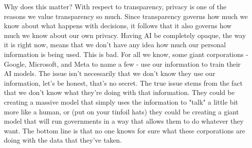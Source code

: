 Why does this matter? With respect to transparency, privacy is one of the reasons we value
transparency so much. Since transparency governs how much we know about what happens with
decisions, it follows that it also governs how much we know about our own privacy. Having AI
be completely opaque, the way it is right now, means that we don't have any idea how much our
personal information is being used. This is bad. For all we know, some giant corporations
- Google, Microsoft, and Meta to name a few - use our information to train their AI models.
The issue isn't necessarily that we don't know they use our information, let's be honest, 
that's no secret. The true issue stems from the fact that we don't know what they're doing
with that information. They could be creating a massive model that simply uses the information
to "talk" a little bit more like a human, or (put on your tinfoil hats) they could be creating
a giant model that will run governments in a way that allows them to do whatever they want.
The bottom line is that no one knows for sure what these corporations are doing with the data
that they've taken.


